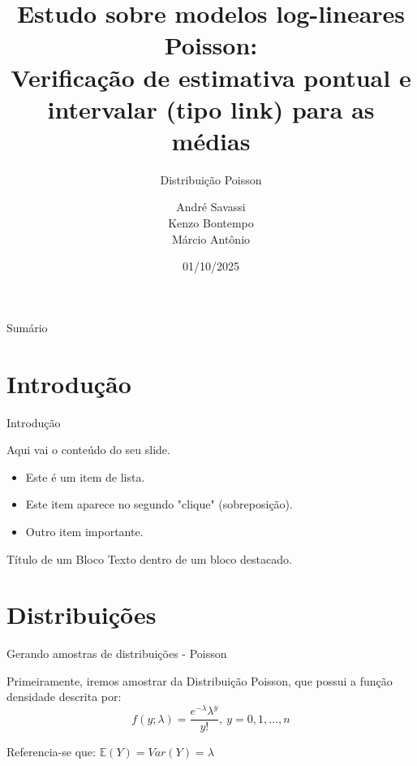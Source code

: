 \documentclass{beamer} %
\title{Estudo sobre modelos log-lineares Poisson: \\ Verificação de estimativa pontual e intervalar (tipo link) para as médias}
\author{André Savassi \\ Kenzo Bontempo \\ Márcio Antônio}
\institute{UFMG}
\date{01/10/2025} %
\begin{document}
	
	\begin{frame}
		\titlepage %
	\end{frame}
	
	\begin{frame}{Sumário}
		\tableofcontents %
	\end{frame}
	
	\section{Introdução}
	
	\begin{frame}{Introdução} %
		
		Aqui vai o conteúdo do seu slide.
		
		\begin{itemize}
			\item Este é um item de lista.
			\item<2-> Este item aparece no segundo "clique" (sobreposição).
			\item Outro item importante.
		\end{itemize}
		
		\begin{block}{Título de um Bloco}
			Texto dentro de um bloco destacado.
		\end{block}
	\end{frame}
	
	\section{Distribuições}
	\begin{frame}{Gerando amostras de distribuições - Poisson}
		\subtitle{Distribuição Poisson}
		Primeiramente, iremos amostrar da Distribuição Poisson, que possui a função densidade descrita por:
		$$f(y; \lambda) = \frac{e^{-\lambda} \lambda^y}{y!}, \ y = 0,1,\dots,n$$
		
		Referencia-se que: $\mathbb{E}(Y) = Var(Y) = \lambda$
 		
	\end{frame}
	
\end{document}
